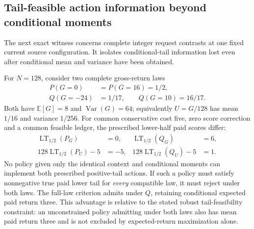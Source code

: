 \subsection{Tail-feasible action information beyond conditional moments}
\label{app:conditional-count-tail-information}
The next exact witness concerns complete integer request contrasts at one
fixed current source configuration. It isolates conditional-tail information
lost even after conditional mean and variance have been obtained.

\begin{proposition}
\label{prop:conditional-count-tail-information}
For $N=128$, consider two complete gross-return laws
\begin{equation}
 \begin{aligned}
 P(G=0)&=P(G=16)=1/2,\\
 Q(G=-24)&=1/17,\qquad Q(G=10)=16/17.
 \end{aligned}
 \label{eq:conditional-count-tail-laws}
\end{equation}
Both have $\mathbb E[G]=8$ and $\operatorname{Var}(G)=64$;
equivalently $U=G/128$ has mean $1/16$ and variance $1/256$.
For common conservative cost five, zero score correction and a common
feasible ledger, the prescribed lower-half paid scores differ:
\begin{equation}
 \begin{aligned}
 \operatorname{LT}_{1/2}(P_G)&=0,&
 \operatorname{LT}_{1/2}(Q_G)&=6,\\
 128\operatorname{LT}_{1/2}(P_U)-5&=-5,&
 128\operatorname{LT}_{1/2}(Q_U)-5&=1.
 \end{aligned}
 \label{eq:conditional-count-tail-actions}
\end{equation}
No policy given only the identical context and conditional moments can
implement both prescribed positive-tail actions. If such a policy must
satisfy nonnegative true paid lower tail for \emph{every} compatible law,
it must reject under both laws. The full-law criterion admits under $Q$,
retaining conditional expected paid return three. This advantage is
relative to the stated robust tail-feasibility constraint: an unconstrained
policy admitting under both laws also has mean paid return three and is
not excluded by expected-return maximization alone.
\end{proposition}
